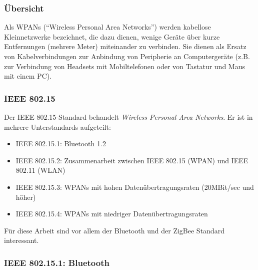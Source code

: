         \subsubsection{Übersicht}
            Als WPANs ("`Wireless Personal Area Networks"') werden kabellose Kleinnetzwerke bezeichnet, die dazu dienen,
            wenige Geräte über kurze Entfernungen (mehrere Meter) miteinander zu verbinden. Sie dienen als Ersatz 
            von Kabelverbindungen zur Anbindung von Peripherie an Computergeräte (z.B. zur Verbindung von
            Headsets mit Mobiltelefonen oder von Tastatur und Maus mit einem PC).
            

        \subsubsection{IEEE 802.15}
            Der IEEE 802.15-Standard behandelt \textsl{Wireless Personal Area Networks}. Er ist in mehrere Unterstandards
            aufgeteilt:

             \begin{itemize}
                \item{IEEE 802.15.1:} Bluetooth 1.2
                \item{IEEE 802.15.2:} Zusammenarbeit zwischen IEEE 802.15 (WPAN) und IEEE 802.11 (WLAN)
                \item{IEEE 802.15.3:} WPANs mit hohen Datenübertragungsraten (20MBit/sec und höher)
                \item{IEEE 802.15.4:} WPANs mit niedriger Datenübertragungsraten
            \end{itemize}

            Für diese Arbeit sind vor allem der Bluetooth und der ZigBee Standard interessant. 

        \subsubsection{IEEE 802.15.1: Bluetooth}
